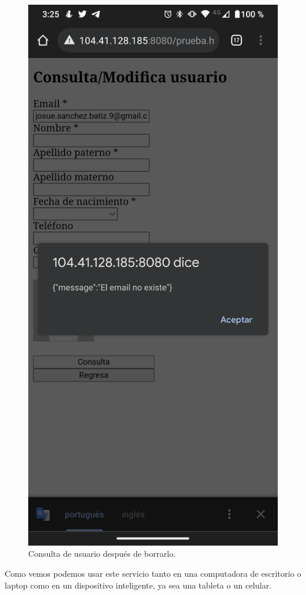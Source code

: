 \documentclass[11pt]{article}
\begin{document}
		\begin{figure}[H]
			\centering
			\includegraphics[scale=0.18]{resources/Screenshot_20211024-152533.png}
			\caption{Consulta de usuario después de borrarlo.}\label{fig:picture}
		\end{figure}
		Como vemos podemos usar este servicio tanto en una computadora de escritorio o laptop como en un dispositivo inteligente, ya sea una tableta o un celular.
\end{document}
